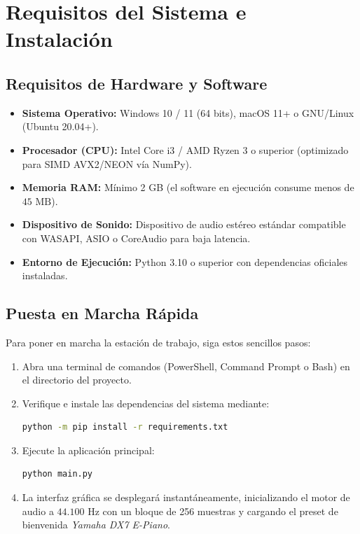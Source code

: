 \documentclass[11pt,a4paper]{article}
\begin{document}
\section{Requisitos del Sistema e Instalación}

\subsection{Requisitos de Hardware y Software}
\begin{itemize}[leftmargin=1.5cm]
    \item \textbf{Sistema Operativo:} Windows 10 / 11 (64 bits), macOS 11+ o GNU/Linux (Ubuntu 20.04+).
    \item \textbf{Procesador (CPU):} Intel Core i3 / AMD Ryzen 3 o superior (optimizado para SIMD AVX2/NEON vía NumPy).
    \item \textbf{Memoria RAM:} Mínimo 2 GB (el software en ejecución consume menos de $45\text{ MB}$).
    \item \textbf{Dispositivo de Sonido:} Dispositivo de audio estéreo estándar compatible con WASAPI, ASIO o CoreAudio para baja latencia.
    \item \textbf{Entorno de Ejecución:} Python 3.10 o superior con dependencias oficiales instaladas.
\end{itemize}

\subsection{Puesta en Marcha Rápida}
Para poner en marcha la estación de trabajo, siga estos sencillos pasos:

\begin{enumerate}[leftmargin=1.5cm]
    \item Abra una terminal de comandos (PowerShell, Command Prompt o Bash) en el directorio del proyecto.
    \item Verifique e instale las dependencias del sistema mediante:
\begin{lstlisting}[language=bash]
python -m pip install -r requirements.txt
\end{lstlisting}
    \item Ejecute la aplicación principal:
\begin{lstlisting}[language=bash]
python main.py
\end{lstlisting}
    \item La interfaz gráfica se desplegará instantáneamente, inicializando el motor de audio a $44.100\text{ Hz}$ con un bloque de 256 muestras y cargando el preset de bienvenida \textit{Yamaha DX7 E-Piano}.
\end{enumerate}
\end{document}
